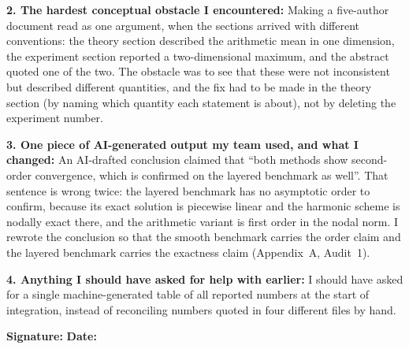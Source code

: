 \begin{formbox}
\textbf{2. The hardest conceptual obstacle I encountered:}
Making a five-author document read as one argument, when the sections arrived
with different conventions: the theory section described the arithmetic mean in
one dimension, the experiment section reported a two-dimensional maximum, and
the abstract quoted one of the two. The obstacle was to see that these were not
inconsistent but described different quantities, and the fix had to be made in
the theory section (by naming which quantity each statement is about), not by
deleting the experiment number.

\textbf{3. One piece of AI-generated output my team used, and what I changed:}
An AI-drafted conclusion claimed that ``both methods show second-order
convergence, which is confirmed on the layered benchmark as well''. That
sentence is wrong twice: the layered benchmark has no asymptotic order to
confirm, because its exact solution is piecewise linear and the harmonic scheme
is nodally exact there, and the arithmetic variant is first order in the nodal
norm. I rewrote the conclusion so that the smooth benchmark carries the order
claim and the layered benchmark carries the exactness claim (Appendix~A,
Audit~1).

\textbf{4. Anything I should have asked for help with earlier:}
I should have asked for a single machine-generated table of all reported
numbers at the start of integration, instead of reconciling numbers quoted in
four different files by hand.

\textbf{Signature:} \underline{\hspace{4.2cm}} \hfill
\textbf{Date:} \underline{\hspace{2.2cm}}
\end{formbox}
